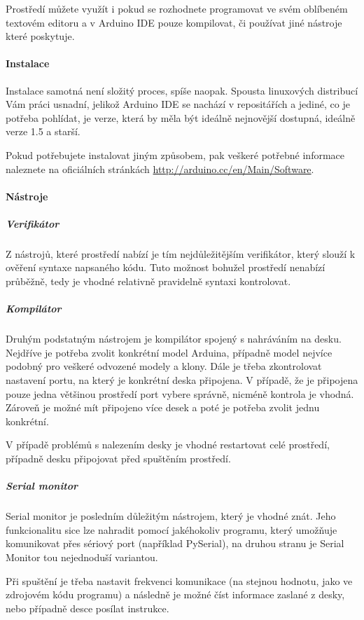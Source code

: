 \documentclass[12pt,titlepage]{article}
\begin{document}
	Prostředí můžete využít i pokud se rozhodnete programovat ve svém oblíbeném textovém editoru a v Arduino IDE pouze kompilovat, či používat jiné nástroje které poskytuje.
		\paragraph{Instalace}
			Instalace samotná není složitý proces, spíše naopak. Spousta linuxových distribucí Vám práci usnadní, jelikož Arduino IDE se nachází v repositářích a jediné, co je potřeba pohlídat, je verze, která by měla být ideálně nejnovější dostupná, ideálně verze 1.5 a starší. 
			
			Pokud potřebujete instalovat jiným způsobem, pak veškeré potřebné informace naleznete na oficiálních stránkách \url{http://arduino.cc/en/Main/Software}.  
		\paragraph{Nástroje}
		
		\subparagraph{Verifikátor}
			Z nástrojů, které prostředí nabízí je tím nejdůležitějším verifikátor, který slouží k ověření syntaxe napsaného kódu. Tuto možnost bohužel prostředí nenabízí průběžně, tedy je vhodné relativně pravidelně syntaxi kontrolovat.
			
		\subparagraph{Kompilátor }
			Druhým podstatným nástrojem je kompilátor spojený s nahráváním na desku. Nejdříve je potřeba zvolit konkrétní model Arduina, případně model nejvíce podobný pro veškeré odvozené modely a klony.  Dále je třeba zkontrolovat nastavení portu, na který je konkrétní deska připojena. V případě, že je připojena pouze jedna většinou prostředí port vybere správně, nicméně kontrola je vhodná. Zároveň je možné mít připojeno více desek a poté je potřeba zvolit jednu konkrétní.
		
			V případě problémů s nalezením desky je vhodné restartovat celé prostředí, případně desku připojovat před spuštěním prostředí.
			
		\subparagraph{Serial monitor}
			Serial monitor je posledním důležitým nástrojem, který je vhodné znát. Jeho funkcionalitu sice lze nahradit pomocí jakéhokoliv programu, který umožňuje komunikovat přes sériový port (například PySerial), na druhou stranu je Serial Monitor tou nejednoduší variantou. 
			
			Při spuštění je třeba nastavit frekvenci komunikace (na stejnou hodnotu, jako ve zdrojovém kódu programu) a následně je možné číst informace zaslané z desky, nebo případně desce posílat instrukce. 
			
\end{document}
